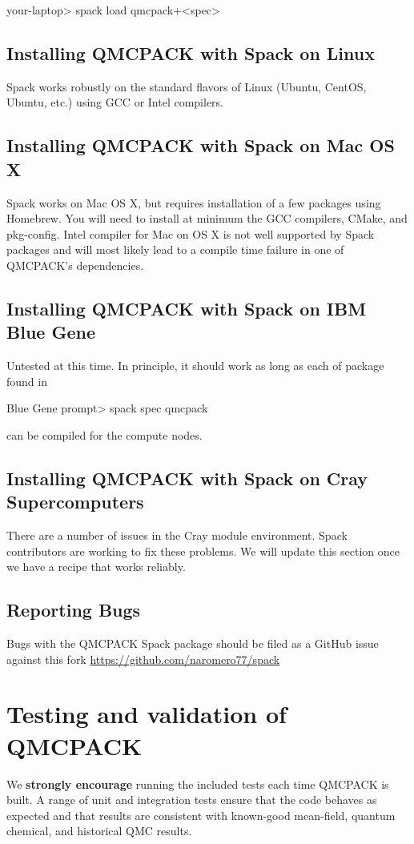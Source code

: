 \begin{shade}
your-laptop> spack load qmcpack+<spec>
\end{shade}

\subsection{Installing QMCPACK with Spack on Linux}
Spack works robustly on the standard flavors of Linux (Ubuntu, CentOS,
Ubuntu, etc.) using GCC or Intel compilers.

\subsection{Installing QMCPACK with Spack on Mac OS X}
Spack works on Mac OS X, but requires installation of a few packages
using Homebrew. You will need to install at minimum the GCC compilers,
CMake, and pkg-config. Intel compiler for Mac on OS X is not well
supported by Spack packages and will most likely lead to a compile
time failure in one of QMCPACK's dependencies.

\subsection{Installing QMCPACK with Spack on IBM Blue Gene}
Untested at this time. In principle, it should work as long as each of
package found in

\begin{shade}
Blue Gene prompt> spack spec qmcpack
\end{shade}
can be compiled for the compute nodes.

\subsection{Installing QMCPACK with Spack on Cray Supercomputers}
There are a number of issues in the Cray module environment. Spack
contributors are working to fix these problems. We will update this
section once we have a recipe that works reliably.

\subsection{Reporting Bugs}
Bugs with the QMCPACK Spack package should be filed as a GitHub issue
against this fork \url{https://github.com/naromero77/spack}

\section{Testing and validation of QMCPACK}
\label{sec:testing}
We \textbf{strongly encourage} running the included tests each time
QMCPACK is built. A range of unit and integration tests ensure that
the code behaves as expected and that results are consistent with
known-good mean-field, quantum chemical, and historical QMC results.

